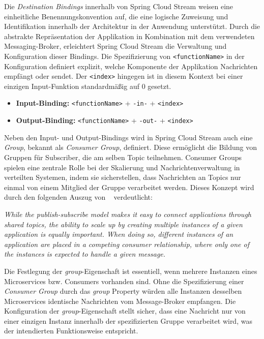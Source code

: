 Die \textit{Destination Bindings} innerhalb von Spring Cloud Stream weisen eine einheitliche Benennungskonvention auf, die eine logische Zuweisung und Identifikation innerhalb der Architektur in der Anwendung unterstützt. Durch die abstrakte Repräsentation der Applikation in Kombination mit dem verwendeten Messaging-Broker, erleichtert Spring Cloud Stream die Verwaltung und Konfiguration dieser Bindings. Die Spezifizierung von \lstinline{<functionName>} in der Konfiguration definiert explizit, welche Komponente der Applikation Nachrichten empfängt oder sendet. Der \lstinline{<index>} hingegen ist in diesem Kontext bei einer einzigen Input-Funktion standardmäßig auf 0 gesetzt.

\begin{itemize}
    \item \textbf{Input-Binding:} \lstinline{<functionName>} + \lstinline{-in-} + \lstinline{<index>}
        \item \textbf{Output-Binding:} \lstinline{<functionName>} + \lstinline{-out-} + \lstinline{<index>}
\end{itemize}
                  
Neben den Input- und Output-Bindings wird in Spring Cloud Stream auch eine \textit{Group}, bekannt als \textit{Consumer Group}, definiert. Diese ermöglicht die Bildung von Gruppen für Subscriber, die am selben Topic teilnehmen. Consumer Groups spielen eine zentrale Rolle bei der Skalierung und Nachrichtenverwaltung in verteilten Systemen, indem sie sicherstellen, dass Nachrichten an Topics nur einmal von einem Mitglied der Gruppe verarbeitet werden. Dieses Konzept wird durch den folgenden Auszug von \citeauthor{springcloudstream}~\parencite[vgl.][]{springcloudstream} verdeutlicht:

\begin{spar}
    \textit{While the publish-subscribe model makes it easy to connect applications through shared topics, the ability to scale up by creating multiple instances of a given application is equally important. When doing so, different instances of an application are placed in a competing consumer relationship, where only one of the instances is expected to handle a given message.~\parencite[][]{springcloudstream}}
\end{spar}

Die Festlegung der \textit{group}-Eigenschaft ist essentiell, wenn mehrere Instanzen eines Microservices bzw. Consumers vorhanden sind. Ohne die Spezifizierung einer \textit{Consumer Group} durch das \textit{group} Property würden alle Instanzen desselben Microservices identische Nachrichten vom Message-Broker empfangen. Die Konfiguration der \textit{group}-Eigenschaft stellt sicher, dass eine Nachricht nur von einer einzigen Instanz innerhalb der spezifizierten Gruppe verarbeitet wird, was der intendierten Funktionsweise entspricht.\newline

